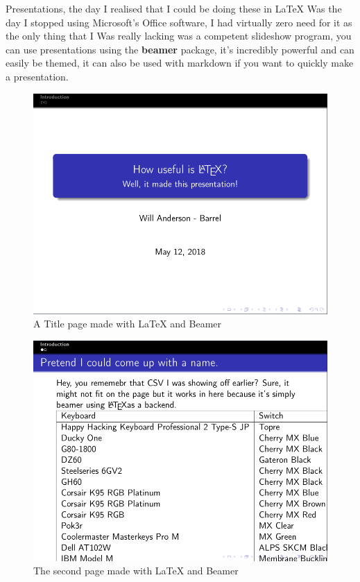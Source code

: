 \documentclass[12pt, letterpaper, oneside]{article} \usepackage[utf8]{inputenc}
\begin{document}
Presentations, the day I realised that I could be doing these in \LaTeX{} Was the day I stopped using Microsoft's Office software, I had virtually zero need for it as the only thing that I Was really lacking was a competent slideshow program, you can use presentations using the \textbf{beamer} package, it's incredibly powerful and can easily be themed, it can also be used with markdown if you want to quickly make a presentation.
\begin{figure}[H]
\includegraphics[width=\linewidth]{titlepage}
	\caption{A Title page made with \LaTeX{} and Beamer}
\end{figure}

\begin{figure}[H]
	\includegraphics[width=\linewidth]{page2}
	\caption{The second page made with \LaTeX{} and Beamer}
\end{figure}
\end{document}
